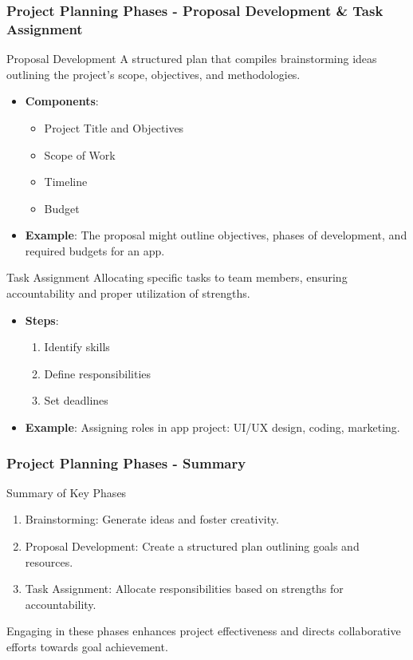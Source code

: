 \documentclass[aspectratio=169]{beamer}
\begin{document}
\begin{frame}[fragile]
    \frametitle{Project Planning Phases - Proposal Development \& Task Assignment}
    \begin{block}{Proposal Development}
        A structured plan that compiles brainstorming ideas outlining the project’s scope, objectives, and methodologies.
    \end{block}
    \begin{itemize}
        \item \textbf{Components}:
        \begin{itemize}
            \item Project Title and Objectives
            \item Scope of Work
            \item Timeline
            \item Budget
        \end{itemize}
        \item \textbf{Example}: The proposal might outline objectives, phases of development, and required budgets for an app.
    \end{itemize}
    
    \begin{block}{Task Assignment}
        Allocating specific tasks to team members, ensuring accountability and proper utilization of strengths.
    \end{block}
    \begin{itemize}
        \item \textbf{Steps}:
        \begin{enumerate}
            \item Identify skills
            \item Define responsibilities
            \item Set deadlines
        \end{enumerate}
        \item \textbf{Example}: Assigning roles in app project: UI/UX design, coding, marketing.
    \end{itemize}
\end{frame}

\begin{frame}[fragile]
    \frametitle{Project Planning Phases - Summary}
    \begin{block}{Summary of Key Phases}
        \begin{enumerate}
            \item Brainstorming: Generate ideas and foster creativity.
            \item Proposal Development: Create a structured plan outlining goals and resources.
            \item Task Assignment: Allocate responsibilities based on strengths for accountability.
        \end{enumerate}
    \end{block}
    Engaging in these phases enhances project effectiveness and directs collaborative efforts towards goal achievement.
\end{frame}
\end{document}
